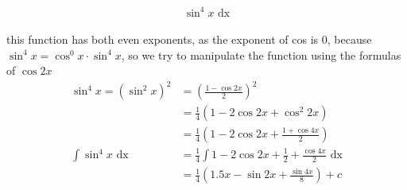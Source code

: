 \documentclass[a4paper,12pt]{article}
\newcommand{\?}{\stackrel{?}{=}}
\begin{document}
\begin{definition}
\begin{my_example}
\[
  \sin^4 x \text{ dx}
\]\\[0pt]
this function has both even exponents, as the exponent of cos is 0, because \(\sin^4 x = \cos^0 x \cdot \sin^4 x\), so we try to manipulate the function using the formulas of \(\cos 2x\)\\[0pt]
\begin{align*}
  \sin^4 x = {(\sin^2 x)}^2 &= {\left(\frac{1 - \cos 2x}{2}\right)}^2\\
  &= \frac14(1 - 2\cos 2x + \cos^2 2x)\\
  &= \frac14\left(1 - 2\cos 2x + \frac{1 + \cos 4x}{2}\right)\\
  \int \sin^4 x \text{ dx} &= \frac14 \int 1 - 2\cos 2x + \frac12 + \frac{\cos 4x}{2} \text{ dx}\\
  &= \frac14\left(1.5x - \sin 2x + \frac{\sin 4x}{8} \right) + c\\
\end{align*}
\end{my_example}
\end{definition}
\end{document}
